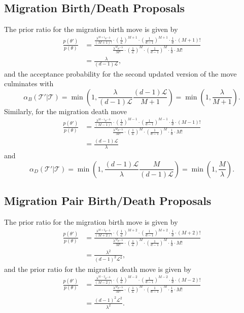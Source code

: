 \documentclass[12pt,a4paper]{article}
\newcommand{\calL}{\mathcal{L}}
\newcommand{\calT}{\mathcal{T}}
\begin{document}
		\subsection{Migration Birth/Death Proposals}
			The prior ratio for the migration birth move is given by
				\begin{align*}
					\frac{p(\theta')}{p(\theta)} & = \frac{\frac{\lambda^{M+1} e^{-\lambda}}{(M+1)!} \cdot \left( \frac{1}{\calL} \right)^{M+1} \cdot \left( \frac{1}{d-1} \right)^{M+1} \cdot \frac{1}{d} \cdot (M+1)!}{\frac{\lambda^M e^{-\lambda}}{M!} \cdot \left( \frac{1}{\calL} \right)^M \cdot \left( \frac{1}{d-1} \right)^M \cdot \frac{1}{d} \cdot M!} \\
						& = \frac{\lambda}{(d-1) \calL },
				\end{align*}
			and the acceptance probability for the second updated version of the move culminates with
				\[
					\alpha_B (\calT' | \calT) = \min \left(1, \frac{\lambda}{(d-1) \calL} \frac{(d-1) \calL}{M+1}\right) = \min \left(1, \frac{\lambda }{M+1}\right).
				\]
			Similarly, for the migration death move
				\begin{align*}
					\frac{p(\theta')}{p(\theta)} & = \frac{\frac{\lambda^{M-1} e^{-\lambda}}{(M-1)!} \cdot \left( \frac{1}{\calL} \right)^{M-1} \cdot \left( \frac{1}{d-1} \right)^{M-1} \cdot \frac{1}{d} \cdot (M-1)!}{\frac{\lambda^M e^{-\lambda}}{M!} \cdot \left( \frac{1}{\calL} \right)^M \cdot \left( \frac{1}{d-1} \right)^M \cdot \frac{1}{d} \cdot M!} \\
						& = \frac{(d-1) \calL }{\lambda}
				\end{align*}
			and
				\[
					\alpha_D (\calT' | \calT) = \min \left(1, \frac{(d-1) \calL}{\lambda} \frac{M}{(d-1) \calL} \right) = \min \left( 1, \frac{M}{\lambda} \right).
				\]
				
			\subsection{Migration Pair Birth/Death Proposals}
				The prior ratio for the migration birth move is given by
					\begin{align*}
						\frac{p(\theta')}{p(\theta)} & = \frac{\frac{\lambda^{M+2} e^{-\lambda}}{(M+2)!} \cdot \left( \frac{1}{\calL} \right)^{M+2} \cdot \left( \frac{1}{d-1} \right)^{M+2} \cdot \frac{1}{d} \cdot (M+2)!}{\frac{\lambda^M e^{-\lambda}}{M!} \cdot \left( \frac{1}{\calL} \right)^M \cdot \left( \frac{1}{d-1} \right)^M \cdot \frac{1}{d} \cdot M!} \\
						& = \frac{\lambda^2}{(d-1)^2 \calL^2 },
					\end{align*}
				and the prior ratio for the migration death move is given by
					\begin{align*}
						\frac{p(\theta')}{p(\theta)} & = \frac{\frac{\lambda^{M -2 } e^{-\lambda}}{(M-2)!} \cdot \left( \frac{1}{\calL} \right)^{M - 2} \cdot \left( \frac{1}{d-1} \right)^{M-2} \cdot \frac{1}{d} \cdot (M-2)!}{\frac{\lambda^M e^{-\lambda}}{M!} \cdot \left( \frac{1}{\calL} \right)^M \cdot \left( \frac{1}{d-1} \right)^M \cdot \frac{1}{d} \cdot M!} \\
						& = \frac{(d-1)^2 \calL^2 }{\lambda^2}.
					\end{align*}
				
\end{document}
